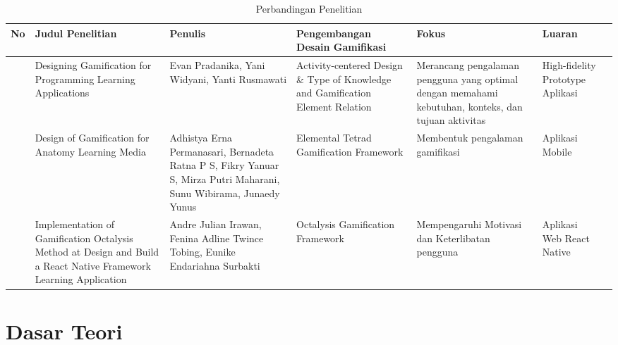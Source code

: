 \begin{landscape}
	\begin{table}[htbp]
	\caption{Perbandingan Penelitian}
	\centering
	\begin{tabular}{|>{\centering\arraybackslash}m{0.5cm}|m{4cm}|m{3.5cm}|m{4.5cm}|m{4.5cm}|m{4cm}|m{4cm}|}
		\hline
		\centering \textbf{No} & \centering \textbf{Judul Penelitian} & \centering \textbf{Penulis} & \centering  \textbf{Pengembangan Desain Gamifikasi} &\centering\textbf{Fokus}&\multicolumn{1}{m{4cm}|}{\centering\textbf{Luaran}} \\
		\hline 
		1 & Designing Gamification for Programming Learning Applications 
		& 
		Evan Pradanika, Yani Widyani,  Yanti Rusmawati
		& Activity-centered Design \& Type of Knowledge and Gamification Element Relation& Merancang pengalaman pengguna yang optimal dengan memahami kebutuhan, konteks, dan tujuan aktivitas& High-fidelity Prototype Aplikasi\\
		\hline
		2 & Design of Gamification for Anatomy Learning Media 
		& 
		Adhistya Erna Permanasari, Bernadeta Ratna P S, Fikry Yanuar S, Mirza Putri Maharani, Sunu Wibirama, Junaedy Yunus
		& Elemental Tetrad Gamification Framework& Membentuk pengalaman gamifikasi & Aplikasi Mobile\\
		\hline
		3 & 
		Implementation of Gamification Octalysis Method at Design and Build a React Native Framework Learning Application 
		& 
		Andre Julian Irawan, Fenina Adline Twince Tobing, Eunike Endariahna Surbakti
		& Octalysis Gamification Framework& Mempengaruhi Motivasi dan Keterlibatan pengguna & Aplikasi Web React Native\\
		\hline
	  \end{tabular}
	\end{table}
\end{landscape}

\newpage
\section{Dasar Teori}
